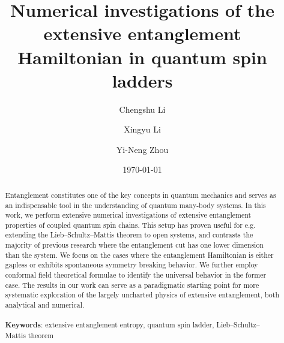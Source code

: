 \documentclass[twocolumn,aps,prb,english]{revtex4-2}
\begin{document}
\title{Numerical investigations of the extensive entanglement Hamiltonian in quantum spin ladders}
\author{Chengshu Li}
\author{Xingyu Li}
\author{Yi-Neng Zhou}
\date{\today}

\begin{abstract}
Entanglement constitutes one of the key concepts in quantum mechanics and serves as an indispensable tool in the understanding of quantum many-body systems. In this work, we perform extensive numerical investigations of extensive entanglement properties of coupled quantum spin chains. This setup has proven useful for e.g. extending the Lieb--Schultz--Mattis theorem to open systems, and contrasts the majority of previous research where the entanglement cut has one lower dimension than the system. We focus on the cases where the entanglement Hamiltonian is either gapless or exhibits spontaneous symmetry breaking behavior. We further employ conformal field theoretical formulae to identify the universal behavior in the former case. The results in our work can serve as a paradigmatic starting point for more systematic exploration of the largely uncharted physics of extensive entanglement, both analytical and numerical.
\\ \\
\noindent
\textbf{Keywords}: extensive entanglement entropy, quantum spin ladder, Lieb--Schultz--Mattis theorem
\end{abstract}

\maketitle
\end{document}

